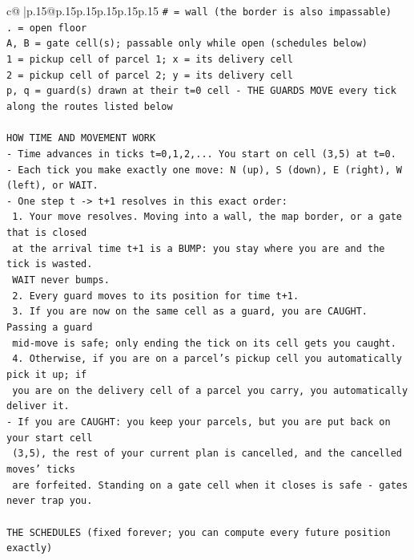 \documentclass{article}
\begin{document}
{\begin{supertabular}{c@{$\;$}|p{.15\linewidth}@{}p{.15\linewidth}p{.15\linewidth}p{.15\linewidth}p{.15\linewidth}p{.15\linewidth}}
{{{\texttt{\# = wall (the border is also impassable)} \\
\texttt{. = open floor} \\
\texttt{A, B = gate cell(s); passable only while open (schedules below)} \\
\texttt{1 = pickup cell of parcel 1; x = its delivery cell} \\
\texttt{2 = pickup cell of parcel 2; y = its delivery cell} \\
\texttt{p, q = guard(s) drawn at their t=0 cell {-} THE GUARDS MOVE every tick along the routes listed below} \\
\\ 
\texttt{HOW TIME AND MOVEMENT WORK} \\
\texttt{{-} Time advances in ticks t=0,1,2,... You start on cell (3,5) at t=0.} \\
\texttt{{-} Each tick you make exactly one move: N (up), S (down), E (right), W (left), or WAIT.} \\
\texttt{{-} One step t {-}> t+1 resolves in this exact order:} \\
\texttt{  1. Your move resolves. Moving into a wall, the map border, or a gate that is closed} \\
\texttt{     at the arrival time t+1 is a BUMP: you stay where you are and the tick is wasted.} \\
\texttt{     WAIT never bumps.} \\
\texttt{  2. Every guard moves to its position for time t+1.} \\
\texttt{  3. If you are now on the same cell as a guard, you are CAUGHT. Passing a guard} \\
\texttt{     mid{-}move is safe; only ending the tick on its cell gets you caught.} \\
\texttt{  4. Otherwise, if you are on a parcel's pickup cell you automatically pick it up; if} \\
\texttt{     you are on the delivery cell of a parcel you carry, you automatically deliver it.} \\
\texttt{{-} If you are CAUGHT: you keep your parcels, but you are put back on your start cell} \\
\texttt{  (3,5), the rest of your current plan is cancelled, and the cancelled moves' ticks} \\
\texttt{  are forfeited. Standing on a gate cell when it closes is safe {-} gates never trap you.} \\
\\ 
\texttt{THE SCHEDULES (fixed forever; you can compute every future position exactly)} \\
}}}
\end{supertabular}}
\end{document}
